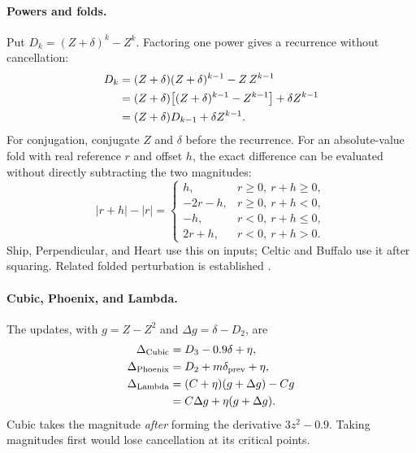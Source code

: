 \documentclass[11pt,a4paper]{article}
\numberwithin{equation}{section}
\newcommand{\abs}[1]{\lvert#1\rvert}
\begin{document}
\paragraph{Powers and folds.}
Put \(D_k=(Z+\delta)^k-Z^k\). Factoring one power gives a recurrence
without cancellation:
\begin{align}
  D_k&=(Z+\delta)(Z+\delta)^{k-1}-Z\,Z^{k-1}\notag\\
     &=(Z+\delta)\big[(Z+\delta)^{k-1}-Z^{k-1}\big]
       +\delta Z^{k-1}\notag\\
     &=(Z+\delta)D_{k-1}+\delta Z^{k-1}. \label{eq:power-delta}
\end{align}
For conjugation, conjugate \(Z\) and \(\delta\) before the recurrence.
For an absolute-value fold with real reference \(r\) and offset \(h\),
the exact difference can be evaluated without directly subtracting the
two magnitudes:
\begin{equation}
  \abs{r+h}-\abs r =
  \begin{cases}
    h,         &r\ge0,\ r+h\ge0,\\
    -2r-h,     &r\ge0,\ r+h<0,\\
    -h,        &r<0,\ r+h\le0,\\
    2r+h,      &r<0,\ r+h>0 .
  \end{cases} \label{eq:fold}
\end{equation}
Ship, Perpendicular, and Heart use this on inputs; Celtic and Buffalo
use it after squaring. Related folded perturbation is established
\cite{heiland,fraktaler,kf}.

\paragraph{Cubic, Phoenix, and Lambda.}
The updates, with \(g=Z-Z^2\) and \(\Delta g=\delta-D_2\), are
\begin{align}
  \Delta_{\rm Cubic}&=D_3-0.9\delta+\eta,\\
  \Delta_{\rm Phoenix}&=D_2+m\delta_{\rm prev}+\eta,\\
  \Delta_{\rm Lambda}
     &=(C+\eta)(g+\Delta g)-Cg\notag\\
     &=C\Delta g+\eta(g+\Delta g).
\end{align}
Cubic takes the magnitude \emph{after} forming the derivative
\(3z^2-0.9\). Taking magnitudes first would lose cancellation at its
critical points.
\end{document}

